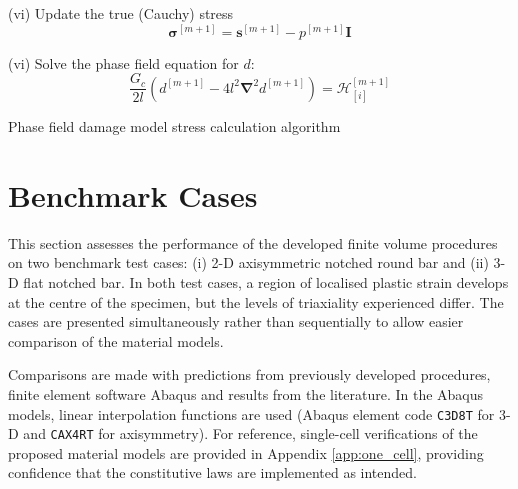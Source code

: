 \documentclass[sn-mathphys,Numbered]{sn-jnl}%
\newcommand{\bb}{\boldsymbol}
\begin{document}
\begin{algorithm}[htbp]
(vi) Update the true (Cauchy) stress
\begin{equation}
	\boldsymbol{\sigma}^{[m+1]} = \boldsymbol{s}^{[m+1]} -  p^{[m+1]}\textbf{I} \nonumber
\end{equation}


(vi) Solve the phase field equation for $d$:
\begin{equation}
	\frac{G_c}{2l}\left(d^{[m+1]} -4l^2 \bb{\nabla}^2 d^{[m+1]} \right) =
	\mathcal{H}^{[m+1]}_{[i]} %
	 \nonumber
\end{equation}

\caption{Phase field damage model stress calculation algorithm}
\end{algorithm}




















\section{Benchmark Cases} \label{sec:test_cases}

This section assesses the performance of the developed finite volume procedures on two benchmark test cases: (i) 2-D axisymmetric notched round bar and (ii) 3-D flat notched bar. %
In both test cases, a region of localised plastic strain develops at the centre of the specimen, but the levels of triaxiality experienced differ.
The cases are presented simultaneously rather than sequentially to allow easier comparison of the material models.



Comparisons are made with predictions from previously developed procedures, finite element software Abaqus and results from the literature.
In the Abaqus models, linear interpolation functions are used (Abaqus element code \texttt{C3D8T} for 3-D and \texttt{CAX4RT} for axisymmetry).
For reference, single-cell verifications of the proposed material models are provided in Appendix \ref{app:one_cell}, providing confidence that the constitutive laws are implemented as intended.
\end{document}
